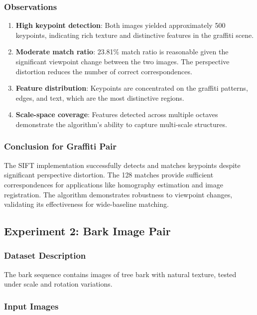 \documentclass[12pt,a4paper]{article}
\begin{document}
\subsubsection{Observations}
\begin{enumerate}
    \item \textbf{High keypoint detection}: Both images yielded approximately 500 keypoints, indicating rich texture and distinctive features in the graffiti scene.
    
    \item \textbf{Moderate match ratio}: 23.81\% match ratio is reasonable given the significant viewpoint change between the two images. The perspective distortion reduces the number of correct correspondences.
    
    \item \textbf{Feature distribution}: Keypoints are concentrated on the graffiti patterns, edges, and text, which are the most distinctive regions.
    
    \item \textbf{Scale-space coverage}: Features detected across multiple octaves demonstrate the algorithm's ability to capture multi-scale structures.
\end{enumerate}

\subsubsection{Conclusion for Graffiti Pair}
The SIFT implementation successfully detects and matches keypoints despite significant perspective distortion. The 128 matches provide sufficient correspondences for applications like homography estimation and image registration. The algorithm demonstrates robustness to viewpoint changes, validating its effectiveness for wide-baseline matching.

\subsection{Experiment 2: Bark Image Pair}

\subsubsection{Dataset Description}
The bark sequence contains images of tree bark with natural texture, tested under scale and rotation variations.

\subsubsection{Input Images}
\end{document}
